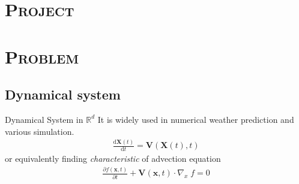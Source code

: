 \documentclass[xcolor=x11names,compress]{beamer}
\renewcommand{\(}{\begin{columns}}
\renewcommand{\)}{\end{columns}}
\newcommand{\<}[1]{\begin{column}{#1}}
\renewcommand{\>}{\end{column}}
\begin{document}
\section{\scshape Project}



\section{\scshape Problem}
\subsection{Dynamical system}
\begin{frame}{Dynamical System in $\mathbb{R}^d$}
It is widely used in numerical weather prediction and various simulation.
\begin{eqnarray}
\frac{\mathrm{d}\mathbf{X}(t)}{\mathrm{d} t} = \mathbf{V}(\mathbf{X}(t),t)
\end{eqnarray}
or equivalently finding \emph{characteristic} of advection equation
\begin{eqnarray}
\frac{\partial f(\mathbf{x},t)}{\partial t} + \mathbf{V}(\mathbf{x},t)\cdot \nabla_x\; f = 0
\end{eqnarray}
\end{frame}


\end{document}
